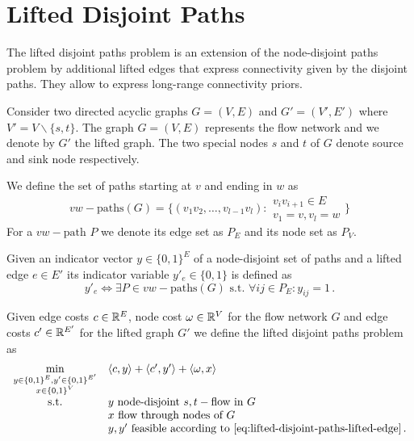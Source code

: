 \section{Lifted Disjoint Paths}
\label{sec:lifted-disjoint-paths}

The lifted disjoint paths problem is an extension of the node-disjoint paths problem by additional lifted edges that express connectivity given by the disjoint paths.
They allow to express long-range connectivity priors.

\begin{definition}
Consider two directed acyclic graphs $G = (V, E)$ and $G' = (V',E')$ where $V' =V\backslash \{s,t\}$.
The graph $G=(V,E)$ represents the flow network and we denote by $G'$ the lifted graph.
The two special nodes $s$ and $t$ of $G$ denote source and sink node respectively.
\end{definition}

\begin{definition}[Paths]
We define the set of paths starting at $v$ and ending in $w$ as
\begin{equation}
vw-\text{paths}(G) = \{
(v_1v_2,\ldots,v_{l-1}v_l) : \begin{array}{c} v_i v_{i+1} \in E \\ v_1 = v, v_l = w \end{array}
 \}
\end{equation}
For a $vw-\text{path}$ $P$ we denote its edge set as $P_E$ and its node
set as $P_V$. 
\end{definition}

\begin{definition}
Given an indicator vector $y \in \{0,1\}^E$ of a node-disjoint set of paths and a lifted edge $e \in E'$ its indicator variable $y'_e \in \{0,1\}$ is defined as
\begin{equation}
\label{eq:lifted-disjoint-paths-lifted-edge}
y'_e \Leftrightarrow \exists P \in vw-\text{paths}(G) \text{ s.t. } \forall ij \in P_E : y_{ij} = 1\,.
\end{equation}
\end{definition}

\begin{definition}
Given edge costs $c \in \mathbb{R}^E$, node cost $\omega \in \mathbb{R}^V$ for the flow network $G$ and edge costs $c' \in \mathbb{R}^{E'}$ for the lifted graph $G'$ we define the lifted disjoint paths problem as
\begin{equation}
\label{eq:lifted-disjoint-paths}
\begin{array}{cl}
\min\limits_{\substack{y \in \{0,1\}^E, y' \in \{0,1\}^{E'} \\ x \in \{0,1\}^V }} 
&
\langle c, y \rangle + \langle c', y' \rangle + \langle \omega, x \rangle \\
\text{s.t.}
& y \text{ node-disjoint } s,t-\text{flow in } G \\
& x \text{ flow through nodes of } G \\
& y,y' \text{ feasible according to~\eqref{eq:lifted-disjoint-paths-lifted-edge}}\,.
\end{array}
\end{equation}
\end{definition}

